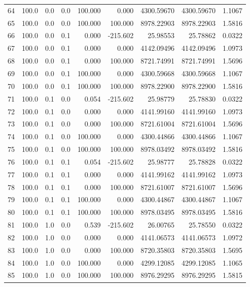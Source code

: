 \begin{longtable}{rrrrrrrrr}
    64 & 100.0 & 0.0 & 0.0 & 100.000 & 0.000 & 4300.59670 & 4300.59670 & 1.1067 \\
    65 & 100.0 & 0.0 & 0.0 & 100.000 & 100.000 & 8978.22903 & 8978.22903 & 1.5816 \\
    66 & 100.0 & 0.0 & 0.1 & 0.000 & -215.602 & 25.98553 & 25.78862 & 0.0322 \\
    67 & 100.0 & 0.0 & 0.1 & 0.000 & 0.000 & 4142.09496 & 4142.09496 & 1.0973 \\
    68 & 100.0 & 0.0 & 0.1 & 0.000 & 100.000 & 8721.74991 & 8721.74991 & 1.5696 \\
    69 & 100.0 & 0.0 & 0.1 & 100.000 & 0.000 & 4300.59668 & 4300.59668 & 1.1067 \\
    70 & 100.0 & 0.0 & 0.1 & 100.000 & 100.000 & 8978.22900 & 8978.22900 & 1.5816 \\
    71 & 100.0 & 0.1 & 0.0 & 0.054 & -215.602 & 25.98779 & 25.78830 & 0.0322 \\
    72 & 100.0 & 0.1 & 0.0 & 0.000 & 0.000 & 4141.99160 & 4141.99160 & 1.0973 \\
    73 & 100.0 & 0.1 & 0.0 & 0.000 & 100.000 & 8721.61004 & 8721.61004 & 1.5696 \\
    74 & 100.0 & 0.1 & 0.0 & 100.000 & 0.000 & 4300.44866 & 4300.44866 & 1.1067 \\
    75 & 100.0 & 0.1 & 0.0 & 100.000 & 100.000 & 8978.03492 & 8978.03492 & 1.5816 \\
    76 & 100.0 & 0.1 & 0.1 & 0.054 & -215.602 & 25.98777 & 25.78828 & 0.0322 \\
    77 & 100.0 & 0.1 & 0.1 & 0.000 & 0.000 & 4141.99162 & 4141.99162 & 1.0973 \\
    78 & 100.0 & 0.1 & 0.1 & 0.000 & 100.000 & 8721.61007 & 8721.61007 & 1.5696 \\
    79 & 100.0 & 0.1 & 0.1 & 100.000 & 0.000 & 4300.44867 & 4300.44867 & 1.1067 \\
    80 & 100.0 & 0.1 & 0.1 & 100.000 & 100.000 & 8978.03495 & 8978.03495 & 1.5816 \\
    81 & 100.0 & 1.0 & 0.0 & 0.539 & -215.602 & 26.00765 & 25.78550 & 0.0322 \\
    82 & 100.0 & 1.0 & 0.0 & 0.000 & 0.000 & 4141.06573 & 4141.06573 & 1.0972 \\
    83 & 100.0 & 1.0 & 0.0 & 0.000 & 100.000 & 8720.35803 & 8720.35803 & 1.5695 \\
    84 & 100.0 & 1.0 & 0.0 & 100.000 & 0.000 & 4299.12085 & 4299.12085 & 1.1065 \\
    85 & 100.0 & 1.0 & 0.0 & 100.000 & 100.000 & 8976.29295 & 8976.29295 & 1.5815 \\

\end{longtable}
